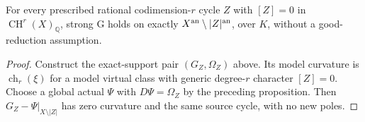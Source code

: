 \begin{corollary}
\label{r11p:chow-zero-G}
For every prescribed rational codimension-$r$ cycle $Z$ with
$[Z]=0$ in $\operatorname{CH}^r(X)_{\mathbb Q}$, strong G holds
on exactly $X^{\rm an}\setminus|Z|^{\rm an}$, over $K$, without
a good-reduction assumption.
\end{corollary}

\begin{proof}
Construct the exact-support pair $(G_Z,\Omega_Z)$ above.
Its model curvature is $\operatorname{ch}_r(\xi)$ for a model
virtual class with generic degree-$r$ character $[Z]=0$.
Choose a global actual $\Psi$ with $D\Psi=\Omega_Z$ by the preceding
proposition.  Then $G_Z-\Psi|_{X\setminus|Z|}$ has zero curvature
and the same source cycle, with no new poles.
\end{proof}

